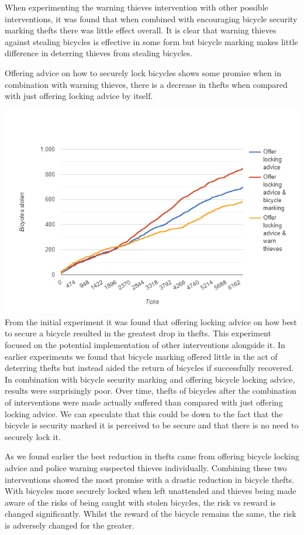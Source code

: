 \documentclass[11pt]{informatics-report}
\begin{document}
When experimenting the warning thieves intervention with other possible interventions, it was found that when combined with encouraging bicycle security marking thefts there was little effect overall. It is clear that warning thieves against stealing bicycles is effective in some form but bicycle marking makes little difference in deterring thieves from stealing bicycles. \par

Offering advice on how to securely lock bicycles shows some promise when in combination with warning thieves, there is a decrease in thefts when compared with just offering locking advice by itself. 

\includegraphics[width = 1\textwidth]{lockall.png}
From the initial experiment it was found that offering locking advice on how best to secure a bicycle resulted in the greatest drop in thefts. This experiment focused on the potential implementation of other interventions alongside it. In earlier experiments we found that bicycle marking offered little in the act of deterring thefts but instead aided the return of bicycles if successfully recovered. In combination with bicycle security marking and offering bicycle locking advice, results were surprisingly poor. Over time, thefts of bicycles after the combination of interventions were made actually suffered than compared with just offering locking advice. We can speculate that this could be down to the fact that the bicycle is security marked it is perceived to be secure and that there is no need to securely lock it. \par

As we found earlier the best reduction in thefts came from offering bicycle locking advice and police warning suspected thieves individually. Combining these two interventions showed the most promise with a drastic reduction in bicycle thefts. With bicycles more securely locked when left unattended and thieves being made aware of the risks of being caught with stolen bicycles, the risk vs reward is changed significantly. Whilst the reward of the bicycle remains the same, the risk is adversely changed for the greater.
\end{document}
